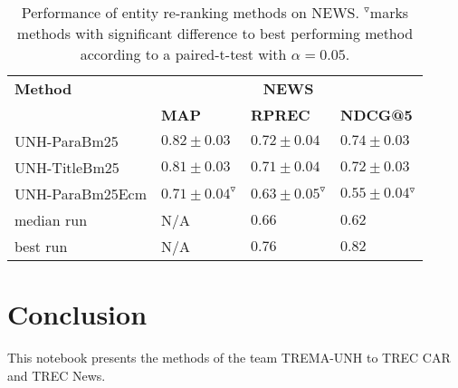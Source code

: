 \documentclass{article}
\begin{document}
\begin{table}
\centering \caption{Performance of entity re-ranking methods on NEWS. $^{\triangledown}$marks
methods with significant difference to best performing method according
to a paired-t-test with $\alpha=0.05$.\label{tab:news-results}}
\begin{center}
\begin{tabular}{llll}
\toprule 
\textbf{Method}  & \multicolumn{3}{c}{\textbf{NEWS}}\tabularnewline
\cmidrule(lr){2-4}  & \textbf{MAP}  & \textbf{RPREC}  & \textbf{NDCG@5} \tabularnewline
\midrule 
UNH-ParaBm25 & $0.82\pm0.03$ & $0.72\pm0.04$ & $0.74\pm0.03$\tabularnewline
UNH-TitleBm25 & $0.81\pm0.03$ & $0.71\pm0.04$ & $0.72\pm0.03$\tabularnewline
UNH-ParaBm25Ecm & $0.71\pm0.04^{\triangledown}$ & $0.63\pm0.05^{\triangledown}$ & $0.55\pm0.04{}^{\triangledown}$\tabularnewline
\midrule
median run & N/A & $0.66$ & $0.62$\tabularnewline
best run & N/A & $0.76$ & $0.82$\tabularnewline
\bottomrule
\end{tabular}
\end{center}
\end{table}






\section{Conclusion}

This notebook presents the methods of the team TREMA-UNH to TREC CAR and TREC News. 





\end{document}

